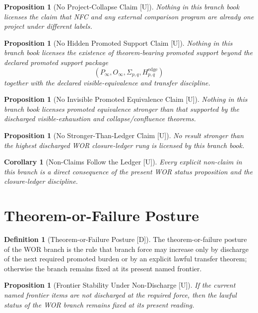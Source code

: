 \documentclass[11pt]{article}
\newtheorem{proposition}[theorem]{Proposition}
\newtheorem{corollary}[theorem]{Corollary}
\theoremstyle{definition}
\newtheorem{definition}[theorem]{Definition}
\theoremstyle{remark}
\newcommand{\U}{\textnormal{[U]}}
\newcommand{\D}{\textnormal{[D]}}
\newcommand{\Pinf}{P_\infty}
\newcommand{\Oinf}{O_\infty}
\newcommand{\Sigmaedge}{\Sigma_{p,q}}
\newcommand{\Hedge}{H^{\mathrm{edge}}_{p,q}}
\begin{document}
\begin{proposition}[No Project-Collapse Claim {\U}]
Nothing in this branch book licenses the claim that NFC and any external comparison program are already one project under different labels.
\end{proposition}

\begin{proposition}[No Hidden Promoted Support Claim {\U}]
Nothing in this branch book licenses the existence of theorem-bearing promoted support beyond the declared promoted support package
\[
(\Pinf,\Oinf,\Sigmaedge,\Hedge)
\]
together with the declared visible-equivalence and transfer discipline.
\end{proposition}

\begin{proposition}[No Invisible Promoted Equivalence Claim {\U}]
Nothing in this branch book licenses promoted equivalence stronger than that supported by the discharged visible-exhaustion and collapse/confluence theorems.
\end{proposition}

\begin{proposition}[No Stronger-Than-Ledger Claim {\U}]
No result stronger than the highest discharged WOR closure-ledger rung is licensed by this branch book.
\end{proposition}

\begin{corollary}[Non-Claims Follow the Ledger {\U}]
Every explicit non-claim in this branch is a direct consequence of the present WOR status proposition and the closure-ledger discipline.
\end{corollary}

\section{Theorem-or-Failure Posture}

\begin{definition}[Theorem-or-Failure Posture {\D}]
The theorem-or-failure posture of the WOR branch is the rule that branch force may increase only by discharge of the next required promoted burden or by an explicit lawful transfer theorem; otherwise the branch remains fixed at its present named frontier.
\end{definition}

\begin{proposition}[Frontier Stability Under Non-Discharge {\U}]
If the current named frontier items are not discharged at the required force, then the lawful status of the WOR branch remains fixed at its present reading.
\end{proposition}
\end{document}

